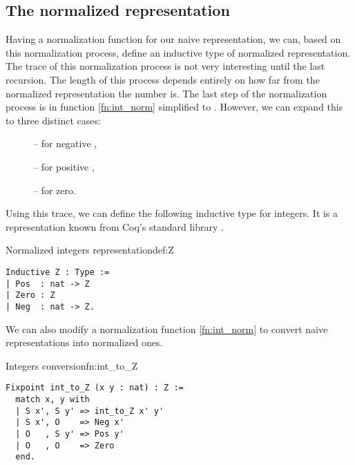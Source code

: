 \subsection{The normalized representation}
Having a normalization function for our naive representation, we can, based on this normalization process, define an inductive type of normalized representation. The trace of this normalization process is not very interesting until the last recursion. The length of this process depends entirely on how far from the normalized representation the number is. The last step of the normalization process is in function \ref{fn:int_norm} simplified to \mcoq{_, _}. However, we can expand this to three distinct cases:
\begin{description}
\item[] -- for negative ,
\item[] -- for positive ,
\item[] -- for zero.
\end{description}
Using this trace, we can define the following inductive type for integers. It is a representation known from Coq's standard library \cite{coqDoc}.
\begin{defi}{Normalized integers representation}{def:Z}
\begin{verbatim}
Inductive Z : Type :=
| Pos  : nat -> Z
| Zero : Z
| Neg  : nat -> Z.
\end{verbatim}
\end{defi}
We can also modify a normalization function \ref{fn:int_norm} to convert naive representations into normalized ones.
\begin{func}{Integers conversion}{fn:int_to_Z}
\begin{verbatim}
Fixpoint int_to_Z (x y : nat) : Z :=
  match x, y with
  | S x', S y' => int_to_Z x' y'
  | S x', O    => Neg x'
  | O   , S y' => Pos y'
  | O   , O    => Zero
  end.
\end{verbatim}
\end{func}
